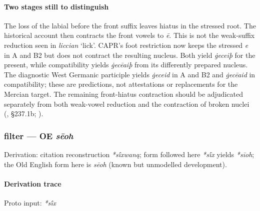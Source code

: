 \documentclass[
  british,
  a4paper,
]{article}
\providecommand{\Recon}[1]{\emph{*#1}}
\begin{document}
\paragraph{Two stages still to
distinguish}\label{two-stages-still-to-distinguish}

The loss of the labial before the front suffix leaves hiatus in the
stressed root. The historical account then contracts the front vowels to
\emph{ē}. This is not the weak-suffix reduction seen in \emph{liccian}
`lick'. CAPR's foot restriction now keeps the stressed \emph{e} in A and
B2 but does not contract the resulting nucleus. Both yield \emph{ġeceiþ}
for the present, while compatibility yields \emph{ġecēaiþ} from its
differently prepared nucleus. The diagnostic West Germanic participle
yields \emph{ġeceid} in A and B2 and \emph{ġecēaid} in compatibility;
these are predictions, not attestations or replacements for the Mercian
target. The remaining front-hiatus contraction should be adjudicated
separately from both weak-vowel reduction and the contraction of broken
nuclei (, §237.1b;
).

\subsubsection{\texorpdfstring{filter --- OE
\emph{sēoh}}{filter --- OE sēoh}}\label{filter-oe-sux113oh}

Derivation: citation reconstruction \emph{*sī́xwaną}; form followed here
\emph{*sī́x} yields \Recon{sīoh}; the Old English form here is
\emph{sēoh} (known but unmodelled development).

\paragraph{Derivation trace}\label{derivation-trace-178}

Proto input: \emph{*sī́x}

\begingroup
\setlength{\fboxsep}{6pt}
\end{document}
